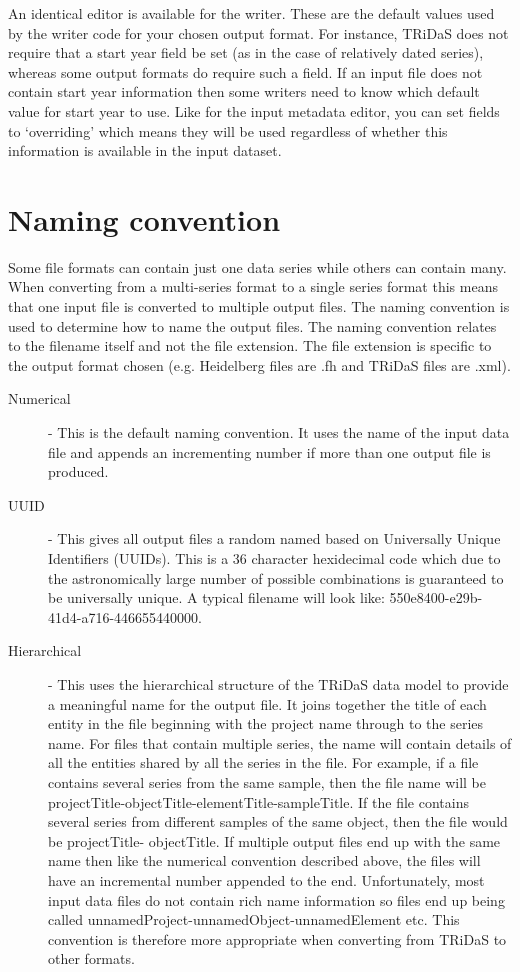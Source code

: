\documentclass[10pt, headsepline,DIV14,BCOR0.5cm]{scrreprt}
\begin{document}
An identical editor is available for the writer. These are the default values used by the writer code for
your chosen output format. For instance, TRiDaS does not require that a start year field be set (as in the
case of relatively dated series), whereas some output formats do require such a field. If an input file does
not contain start year information then some writers need to know which default value for start year to
use. Like for the input metadata editor, you can set fields to `overriding' which means they will be used
regardless of whether this information is available in the input dataset.

\section{Naming convention}

Some file formats can contain just one data series while others can contain many. When converting from
a multi-series format to a single series format this means that one input file is converted to multiple output
files. The naming convention is used to determine how to name the output files. The naming convention
relates to the filename itself and not the file extension. The file extension is specific to the output format
chosen (e.g. Heidelberg files are .fh and TRiDaS files are .xml).

\begin{description}
 \item[Numerical] - This is the default naming convention. It uses the name of the input data file and
appends an incrementing number if more than one output file is produced.
 \item[UUID] - This gives all output files a random named based on Universally Unique Identifiers
(UUIDs). This is a 36 character hexidecimal code which due to the astronomically
large number of possible combinations is guaranteed to be universally unique. A
typical filename will look like: 550e8400-e29b-41d4-a716-446655440000.
 \item[Hierarchical] - This uses the hierarchical structure of the TRiDaS data model to provide a meaningful
name for the output file. It joins together the title of each entity in the file beginning
with the project name through to the series name. For files that contain multiple series,
the name will contain details of all the entities shared by all the series in the file. For
example, if a file contains several series from the same sample, then the file name
will be projectTitle-objectTitle-elementTitle-sampleTitle. If the file contains several
series from different samples of the same object, then the file would be projectTitle-
objectTitle. If multiple output files end up with the same name then like the numerical
convention described above, the files will have an incremental number appended to
the end. Unfortunately, most input data files do not contain rich name information
so files end up being called unnamedProject-unnamedObject-unnamedElement etc.
This convention is therefore more appropriate when converting from TRiDaS to other
formats.
 \end{description}
\end{document}
